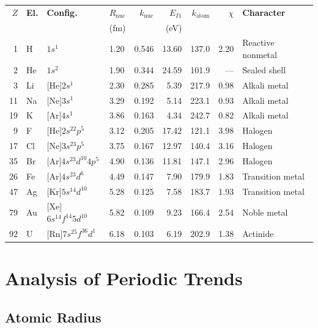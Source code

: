 \begin{center}
\begin{tabular}{rlllrrrrl}
\hline
$Z$ & \textbf{El.} & \textbf{Config.} & $R_{\text{nuc}}$ & $k_{\text{nuc}}$ & $E_{I1}$ & $k_{\text{atom}}$ & $\chi$ & \textbf{Character} \\
 & & & (fm) & & (eV) & & & \\
\hline
 1 & H  & $1s^1$              & 1.20 & 0.546 & 13.60 & 137.0 & 2.20 & Reactive nonmetal \\
 2 & He & $1s^2$              & 1.90 & 0.344 & 24.59 & 101.9 & --- & Sealed shell \\
\hline
 3 & Li & [He]$2s^1$          & 2.30 & 0.285 &  5.39 & 217.9 & 0.98 & Alkali metal \\
11 & Na & [Ne]$3s^1$          & 3.29 & 0.192 &  5.14 & 223.1 & 0.93 & Alkali metal \\
19 & K  & [Ar]$4s^1$          & 3.86 & 0.163 &  4.34 & 242.7 & 0.82 & Alkali metal \\
\hline
 9 & F  & [He]$2s^22p^5$      & 3.12 & 0.205 & 17.42 & 121.1 & 3.98 & Halogen \\
17 & Cl & [Ne]$3s^23p^5$      & 3.75 & 0.167 & 12.97 & 140.4 & 3.16 & Halogen \\
35 & Br & [Ar]$4s^23d^{10}4p^5$ & 4.90 & 0.136 & 11.81 & 147.1 & 2.96 & Halogen \\
\hline
26 & Fe & [Ar]$4s^23d^6$      & 4.49 & 0.147 &  7.90 & 179.9 & 1.83 & Transition metal \\
47 & Ag & [Kr]$5s^14d^{10}$   & 5.28 & 0.125 &  7.58 & 183.7 & 1.93 & Transition metal \\
79 & Au & [Xe]$6s^14f^{14}5d^{10}$ & 5.82 & 0.109 &  9.23 & 166.4 & 2.54 & Noble metal \\
\hline
92 & U  & [Rn]$7s^25f^36d^1$  & 6.18 & 0.103 &  6.19 & 202.9 & 1.38 & Actinide \\
\hline
\end{tabular}
\end{center}


\section{Analysis of Periodic Trends}

\subsection{Atomic Radius}

